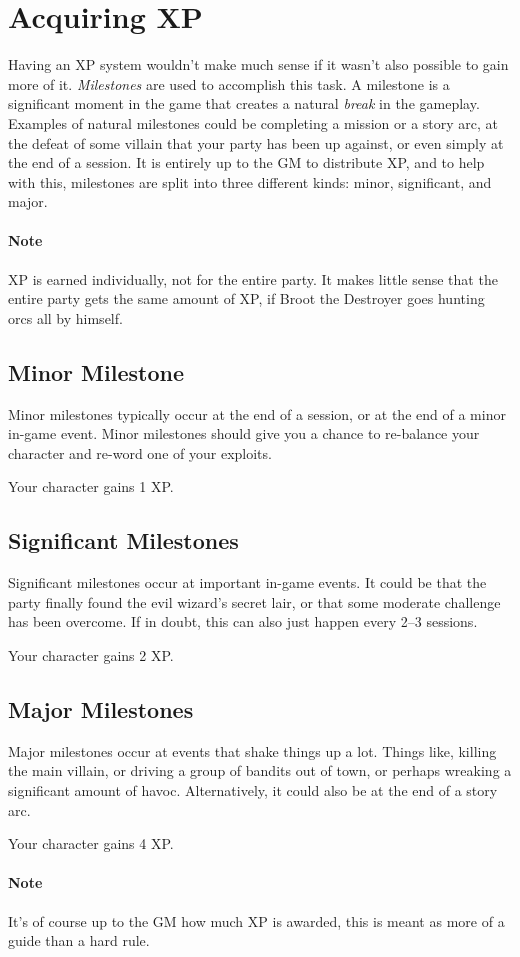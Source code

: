 \section{Acquiring XP}
Having an XP system wouldn't make much sense if it wasn't also possible to gain more of it.
\textit{Milestones} are used to accomplish this task.
A milestone is a significant moment in the game that creates a natural \textit{break} in the gameplay.
Examples of natural milestones could be completing a mission or a story arc, at the defeat of some villain that your party has been up against, or even simply at the end of a session.
It is entirely up to the GM to distribute XP, and to help with this, milestones are split into three different kinds: minor, significant, and major.

\paragraph{Note} XP is earned individually, not for the entire party.
It makes little sense that the entire party gets the same amount of XP, if Broot the Destroyer goes hunting orcs all by himself.

\subsection{Minor Milestone}
Minor milestones typically occur at the end of a session, or at the end of a minor in-game event.
Minor milestones should give you a chance to re-balance your character and re-word one of your exploits.

Your character gains 1 XP.

\subsection{Significant Milestones}
Significant milestones occur at important in-game events.
It could be that the party finally found the evil wizard's secret lair, or that some moderate challenge has been overcome.
If in doubt, this can also just happen every 2--3 sessions.

Your character gains 2 XP.

\subsection{Major Milestones}
Major milestones occur at events that shake things up a lot.
Things like, killing the main villain, or driving a group of bandits out of town, or perhaps wreaking a significant amount of havoc.
Alternatively, it could also be at the end of a story arc.

Your character gains 4 XP.

\paragraph{Note} It's of course up to the GM how much XP is awarded, this is meant as more of a guide than a hard rule.
